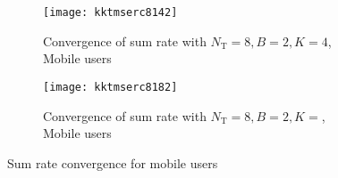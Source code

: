 \begin{figure}
	\centering
	\begin{subfigure}[b]{0.75\textwidth}
		\centering
		\texttt{[image: kktmserc8142]}
		\caption{Convergence of sum rate with $N_\mathrm{T} = 8, B = 2, K = 4$, Mobile users}
		\label{fig_1}
	\end{subfigure}
	\begin{subfigure}[b]{0.75\textwidth}
		\centering
		\texttt{[image: kktmserc8182]}
		\caption{Convergence of sum rate with $N_\mathrm{T} = 8, B = 2, K = $, Mobile users}
		\label{fig-2}
	\end{subfigure}
	\caption{Sum rate convergence for mobile users}
	\label{figIII}
\end{figure}

